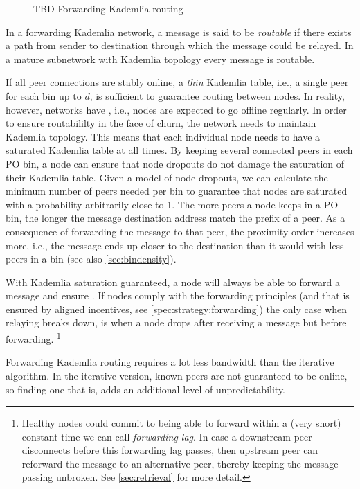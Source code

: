 \begin{figure}[htbp]
   \centering
   \caption[Forwarding Kademlia routing]{TBD Forwarding Kademlia routing}
   \label{fig:forwarding-kademlia}
\end{figure}

In a forwarding Kademlia network, a message is said to be \emph{routable} if there exists a path from sender to destination through which the message could be relayed. In a mature subnetwork with Kademlia topology every message is routable. 

If all peer connections are stably online, a \emph{thin} Kademlia table, i.e., a single peer for each bin up to $d$, is sufficient to guarantee routing between nodes. In reality, however, networks have , i.e., nodes are expected to go offline regularly. In order to ensure routabililty in the face of churn, the network needs to maintain Kademlia topology. This means that each individual node needs to have a saturated Kademlia table at all times. By keeping several connected peers in each PO bin, a node can ensure that node dropouts do not damage the saturation of their Kademlia table. Given a model of node dropouts, we can calculate the minimum number of peers needed per bin to guarantee that nodes are saturated with a probability arbitrarily close to 1. The more peers a node keeps in a PO bin, the longer the message destination address match the prefix of a peer. As a consequence of forwarding the message to that peer, the proximity order increases more, i.e., the message ends up closer to the destination than it would with less peers in a bin (see also \ref{sec:bindensity}).



With Kademlia saturation guaranteed, a node will always be able to forward a message and ensure . If nodes comply with the forwarding principles (and that is ensured by aligned incentives, see \ref{spec:strategy:forwarding}) the only case when relaying breaks down, is when a node drops after receiving a message but before forwarding.%
%
\footnote{Healthy nodes could commit to being able to forward within a (very short) constant time we can call \emph{forwarding lag}. In case a downstream peer disconnects before this forwarding lag passes, then upstream peer can reforward the message to an alternative peer, thereby keeping the message passing unbroken. See \ref{sec:retrieval} for more detail.
} 

Forwarding Kademlia routing requires a lot less bandwidth than the iterative algorithm. In the iterative version, known peers are not guaranteed to be online, so finding one that is, adds an additional level of unpredictability.

